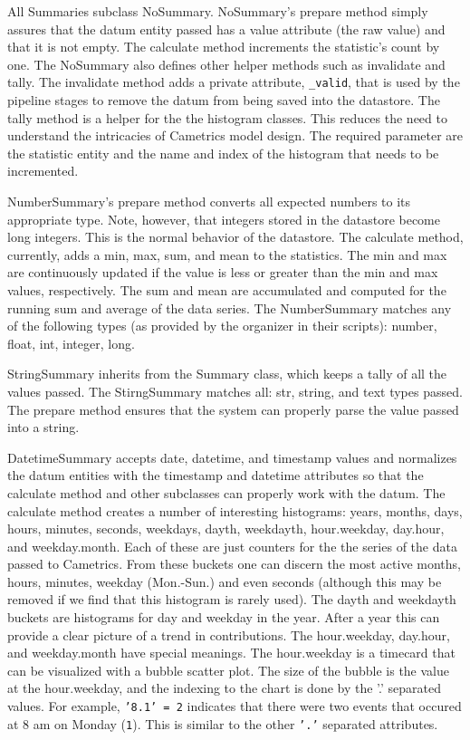 \documentclass[10pt,a4paper,english]{article}
\begin{document}
All Summaries subclass NoSummary. NoSummary's prepare method simply assures that the datum entity passed has a value attribute (the raw value) and that it is not empty. The calculate method increments the statistic's count by one. The NoSummary also defines other helper methods such as invalidate and tally. The invalidate method adds a private attribute, \texttt{{\_}valid}, that is used by the pipeline stages to remove the datum from being saved into the datastore. The tally method is a helper for the the histogram classes. This reduces the need to understand the intricacies of Cametrics model design. The required parameter are the statistic entity and the name and index of the histogram that needs to be incremented.

NumberSummary's prepare method converts all expected numbers to its appropriate type. Note, however, that integers stored in the datastore become long integers. This is the normal behavior of the datastore. The calculate method, currently, adds a min, max, sum, and mean to the statistics. The min and max are continuously updated if the value is less or greater than the min and max values, respectively. The sum and mean are accumulated and computed for the running sum and average of the data series. The NumberSummary matches any of the following types (as provided by the organizer in their scripts): number, float, int, integer, long.

StringSummary inherits from the Summary class, which keeps a tally of all the values passed. The StirngSummary matches all: str, string, and text types passed. The prepare method ensures that the system can properly parse the value passed into a string.

DatetimeSummary accepts date, datetime, and timestamp values and normalizes the datum entities with the timestamp and datetime attributes so that the calculate method and other subclasses can properly work with the datum. The calculate method creates a number of interesting histograms: years, months, days, hours, minutes, seconds, weekdays, dayth, weekdayth, hour.weekday, day.hour, and weekday.month. Each of these are just counters for the the series of the data passed to Cametrics. From these buckets one can discern the most active months, hours, minutes, weekday (Mon.-Sun.) and even seconds (although this may be removed if we find that this histogram is rarely used). The dayth and weekdayth buckets are histograms for day and weekday in the year. After a year this can provide a clear picture of a trend in contributions. The hour.weekday, day.hour, and weekday.month have special meanings. The hour.weekday is a timecard that can be visualized with a bubble scatter plot. The size of the bubble is the value at the hour.weekday, and the indexing to the chart is done by the '.' separated values. For example, \texttt{'8.1' = 2} indicates that there were two events that occured at 8 am on Monday (\texttt{1}). This is similar to the other \texttt{'.'} separated attributes.
\end{document}
